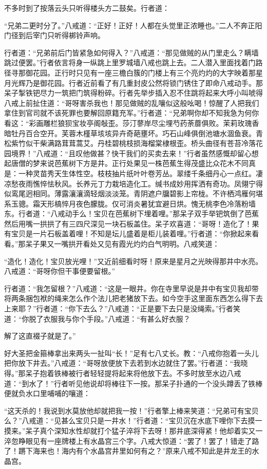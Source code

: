 \documentclass[12pt,UTF8]{ctexbook}
\begin{document}
不多时到了按落云头只听得楼头方二鼓矣。行者道：

“兄弟二更时分了。”八戒道：“正好！正好！人都在头觉里正浓睡也。”二人不奔正阳门径到后宰门只听得梆铃声响。

行者道：“兄弟前后门皆紧急如何得入？”八戒道：“那见做贼的从门里走么？瞒墙跳过便罢。”行者依言将身一纵跳上里罗城墙八戒也跳上去。二人潜入里面找着门路径寻那御花园。正行时只见有一座三檐白簇的门楼上有三个亮灼灼的大字映着那星月光辉乃是御花园。行者近前看了有几重封皮公然将锁门锈住了即命八戒动手。那呆子掣铁钯尽力一筑把门筑得粉碎。行者先举步插入忍不住跳将起来大呼小叫唬得八戒上前扯住道：“哥呀害杀我也！那见做贼的乱嚷似这般吆喝！惊醒了人把我们拿住到官司就不该死罪也要解回原籍充军。”行者道：“兄弟啊你却不知我急为何你看这：“彩画雕栏狼狈宝妆亭阁敧歪。莎汀蓼岸尽尘埋芍药荼蘼俱败。茉莉玫瑰香暗牡丹百合空开。芙蓉木槿草垓垓异卉奇葩壅坏。巧石山峰俱倒池塘水涸鱼衰。青松紫竹似干柴满路茸茸蒿艾。丹桂碧桃枝损海榴棠棣根歪。桥头曲径有苍苔冷落花园境界！”八戒道：“且叹他做甚？快干我们的买卖去来！”行者虽然感慨却留心想起唐僧的梦来说芭蕉树下方是井。正行处果见一株芭蕉生得茂盛比众花木不同真是：一种灵苗秀天生体性空。枝枝抽片纸叶叶卷芳丛。翠缕千条细丹心一点红。凄凉愁夜雨憔悴怯秋风。长养元丁力栽培造化工。缄书成妙用挥洒有奇功。凤翎宁得似鸾尾迥相同。薄露瀼瀼滴轻烟淡淡笼。青阴遮户牖碧影上帘栊。不许栖鸿雁何堪系玉骢。霜天形槁悴月夜色朦胧。仅可消炎暑犹宜避日烘。愧无桃李色冷落粉墙东。行者道：“八戒动手么！宝贝在芭蕉树下埋着哩。”那呆子双手举钯筑倒了芭蕉然后用嘴一拱拱了有三四尺深见一块石板盖住。呆子欢喜道：“哥呀！造化了！果有宝贝是一片石板盖着哩！不知是坛儿盛着是柜儿装着哩。”行者道：“你掀起来看看。”那呆子果又一嘴拱开看处又见有霞光灼灼白气明明。八戒笑道：

“造化！造化！宝贝放光哩！”又近前细看时呀！原来是星月之光映得那井中水亮。八戒道：“哥呀你但干事便要留根。”

行者道：“我怎留根？”八戒道：“这是一眼井。你在寺里早说是井中有宝贝我却带将两条捆包袱的绳来怎么作个法儿把老猪放下去。如今空手这里面东西怎么得下去上来耶？”行者道：“你下去么？”八戒道：“正是要下去只是没绳索。”行者笑道：“你脱了衣服我与你个手段。”八戒道：“有甚么好衣服？

解了这直裰子就是了。”

好大圣把金箍棒拿出来两头一扯叫“长！”足有七八丈长。教：“八戒你抱着一头儿把你放下井去。”八戒道：“哥呀放便放下去若到水边就住了罢。”行者道：“我晓得。”那呆子抱着铁棒被行者轻轻提将起来将他放下去。不多时放至水边八戒道：“到水了！”行者听见他说却将棒往下一按。那呆子扑通的一个没头蹲丢了铁棒便就负水口里哺哺的嚷道：

“这天杀的！我说到水莫放他却就把我一按！”行者擎上棒来笑道：“兄弟可有宝贝么？”八戒道：“见甚么宝贝只是一井水！”行者道：“宝贝沉在水底下哩你下去摸一摸来。”呆子真个深知水性却就打个猛子淬将下去呀！那井底深得紧！他却着实又一淬忽睁眼见有一座牌楼上有水晶宫三个字。八戒大惊道：“罢了！罢了！错走了路了！蹡下海来也！海内有个水晶宫井里如何有之？”原来八戒不知此是井龙王的水晶宫。
\end{document}
